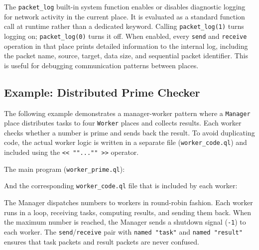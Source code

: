 The \texttt{packet\_log} built-in system function enables or disables diagnostic logging for
network activity in the current place. It is evaluated as a standard function call at runtime rather than a dedicated keyword. Calling \texttt{packet\_log(1)} turns
logging on; \texttt{packet\_log(0)} turns it off. When enabled, every
\texttt{send} and \texttt{receive} operation in that place prints detailed
information to the internal log, including the packet name, source, target,
data size, and sequential packet identifier. This is useful for debugging
communication patterns between places.



\subsection{Example: Distributed Prime Checker}
\label{sec:worker-prime-example}

The following example demonstrates a manager-worker pattern where a
\texttt{Manager} place distributes tasks to four \texttt{Worker} places and
collects results. Each worker checks whether a number is prime and sends back
the result. To avoid duplicating code, the actual worker logic is written in a
separate file (\texttt{worker\_code.ql}) and included using the
\texttt{<< ""..."" >>} operator.

The main program (\texttt{worker\_prime.ql}):



And the corresponding \texttt{worker\_code.ql} file that is included by each worker:



The Manager dispatches numbers to workers in round-robin fashion. Each worker
runs in a loop, receiving tasks, computing results, and sending them back.
When the maximum number is reached, the Manager sends a shutdown signal
(\texttt{-1}) to each worker. The \texttt{send}/\texttt{receive} pair with
\texttt{named "task"} and \texttt{named "result"} ensures that task packets
and result packets are never confused.

